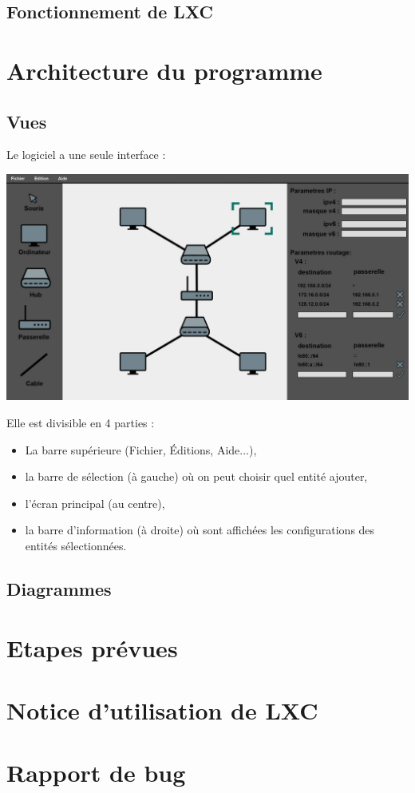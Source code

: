 \documentclass[a4paper]{article}
\begin{document}
\subsection{Fonctionnement de LXC}

\newpage
\section{Architecture du programme}
\subsection{Vues}
Le logiciel a une seule interface : 
\begin{center}
\includegraphics[scale=0.2]{bulto.png}
\end{center}

Elle est divisible en 4 parties : 
\begin{itemize}
\item La barre supérieure (Fichier, Éditions, Aide...),
\item la barre de sélection (à gauche) où on peut choisir quel entité ajouter,
\item l'écran principal (au centre),
\item la barre d'information (à droite) où sont affichées les configurations des entités sélectionnées.
\end{itemize}

\subsection{Diagrammes}


\section{Etapes pr\'evues}


\section{Notice d'utilisation de LXC}

\section{Rapport de bug}
\end{document}
